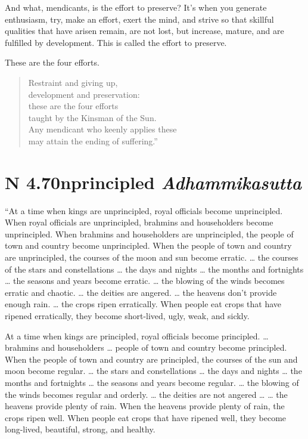 \documentclass[12pt,openany]{book}%
\newcommand*{\suttatitleacronym}[1]{\smaller[2]{#1}\vspace*{.3em}}
\newcommand*{\suttatitletranslation}[1]{\linebreak{#1}}
\newcommand*{\suttatitleroot}[1]{\linebreak\smaller[2]\itshape{#1}}
\newcommand*{\tocacronym}[1]{\hspace*{-3.3em}{#1}\quad}
\newcommand*{\toctranslation}[1]{#1}
\newcommand*{\tocroot}[1]{(\textit{#1})}
\begin{document}
And what, mendicants, is the effort to preserve? It’s when you generate enthusiasm, try, make an effort, exert the mind, and strive so that skillful qualities that have arisen remain, are not lost, but increase, mature, and are fulfilled by development. This is called the effort to preserve. 

These are the four efforts. 

\begin{verse}%
Restraint and giving up, \\
development and preservation: \\
these are the four efforts \\
taught by the Kinsman of the Sun. \\
Any mendicant who keenly applies these \\
may attain the ending of suffering.” 

%
\end{verse}

%
\section*{{\suttatitleacronym AN 4.70}{\suttatitletranslation Unprincipled }{\suttatitleroot Adhammikasutta}}
\addcontentsline{toc}{section}{\tocacronym{AN 4.70} \toctranslation{Unprincipled } \tocroot{Adhammikasutta}}

“At a time when kings are unprincipled, royal officials become unprincipled. When royal officials are unprincipled, brahmins and householders become unprincipled. When brahmins and householders are unprincipled, the people of town and country become unprincipled. When the people of town and country are unprincipled, the courses of the moon and sun become erratic. … the courses of the stars and constellations … the days and nights … the months and fortnights … the seasons and years become erratic. … the blowing of the winds becomes erratic and chaotic. … the deities are angered. … the heavens don’t provide enough rain. … the crops ripen erratically. When people eat crops that have ripened erratically, they become short-lived, ugly, weak, and sickly. 

At a time when kings are principled, royal officials become principled. … brahmins and householders … people of town and country become principled. When the people of town and country are principled, the courses of the sun and moon become regular. … the stars and constellations … the days and nights … the months and fortnights … the seasons and years become regular. … the blowing of the winds becomes regular and orderly. … the deities are not angered … … the heavens provide plenty of rain. When the heavens provide plenty of rain, the crops ripen well. When people eat crops that have ripened well, they become long-lived, beautiful, strong, and healthy. 
\end{document}

